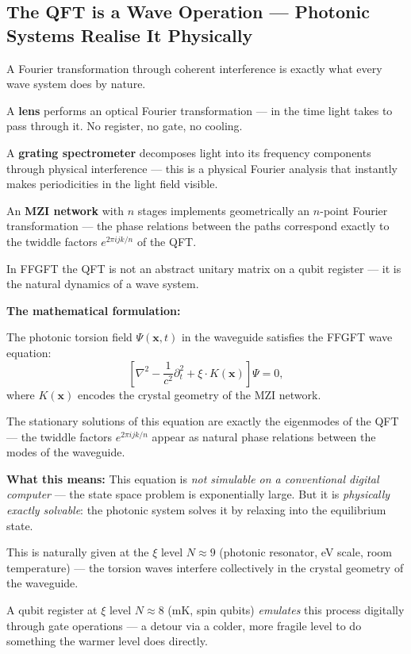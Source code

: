 \subsection{The QFT is a Wave Operation ---
  Photonic Systems Realise It Physically}

A Fourier transformation through coherent interference
is exactly what every wave system does by nature.

A \textbf{lens} performs an optical
Fourier transformation --- in the time
light takes to pass through it.
No register, no gate, no cooling.

A \textbf{grating spectrometer} decomposes light
into its frequency components through physical
interference --- this is a physical
Fourier analysis that instantly makes periodicities
in the light field visible.

An \textbf{MZI network} with $n$ stages implements
geometrically an $n$-point Fourier transformation ---
the phase relations between the paths correspond
exactly to the twiddle factors $e^{2\pi i jk/n}$ of the QFT.

\begin{foundation}
In FFGFT the QFT is not an abstract unitary matrix
on a qubit register ---
it is the natural dynamics of a wave system.

\textbf{The mathematical formulation:}

The photonic torsion field $\Psi(\mathbf{x}, t)$
in the waveguide satisfies the FFGFT wave equation:
\begin{equation}
  \label{eq:photon-wave}
  \left[\nabla^2 - \frac{1}{c^2}\partial_t^2
  + \xi \cdot K(\mathbf{x})\right]\Psi = 0,
\end{equation}
where $K(\mathbf{x})$ encodes the crystal geometry of the
MZI network.

The stationary solutions of this equation are
exactly the eigenmodes of the QFT ---
the twiddle factors $e^{2\pi i jk/n}$
appear as natural phase relations
between the modes of the waveguide.

\textbf{What this means:}
This equation is \emph{not simulable on a conventional
digital computer} ---
the state space problem is exponentially large.
But it is \emph{physically exactly solvable}:
the photonic system solves it by
relaxing into the equilibrium state.

This is naturally given at the $\xi$ level $N \approx 9$
(photonic resonator, eV scale, room temperature) ---
the torsion waves interfere collectively in the crystal geometry
of the waveguide.

A qubit register at $\xi$ level $N \approx 8$
(mK, spin qubits) \emph{emulates} this process
digitally through gate operations ---
a detour via a colder, more fragile level
to do something the warmer level does directly.
\end{foundation}


